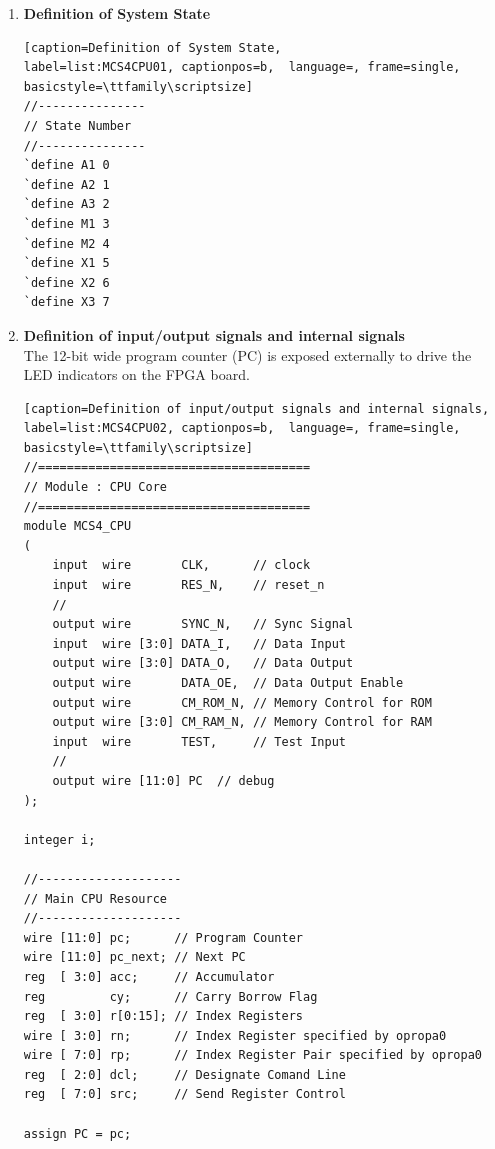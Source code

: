 \begin{enumerate}[(1)]
\item \textbf{Definition of System State}\\
\begin{lstlisting}[caption=Definition of System State, 
label=list:MCS4CPU01, captionpos=b,  language=, frame=single, basicstyle=\ttfamily\scriptsize]
//---------------
// State Number
//---------------
`define A1 0
`define A2 1
`define A3 2
`define M1 3
`define M2 4
`define X1 5
`define X2 6
`define X3 7
\end{lstlisting}

\item \textbf{Definition of input/output signals and internal signals}\\
The 12-bit wide program counter (PC) is exposed externally to drive the LED indicators on the FPGA board.\\
\begin{lstlisting}[caption=Definition of input/output signals and internal signals, 
label=list:MCS4CPU02, captionpos=b,  language=, frame=single, basicstyle=\ttfamily\scriptsize]
//======================================
// Module : CPU Core
//======================================
module MCS4_CPU
(
    input  wire       CLK,      // clock
    input  wire       RES_N,    // reset_n
    //
    output wire       SYNC_N,   // Sync Signal
    input  wire [3:0] DATA_I,   // Data Input
    output wire [3:0] DATA_O,   // Data Output
    output wire       DATA_OE,  // Data Output Enable
    output wire       CM_ROM_N, // Memory Control for ROM
    output wire [3:0] CM_RAM_N, // Memory Control for RAM
    input  wire       TEST,     // Test Input
    //
    output wire [11:0] PC  // debug
);

integer i;

//--------------------
// Main CPU Resource
//--------------------
wire [11:0] pc;      // Program Counter
wire [11:0] pc_next; // Next PC
reg  [ 3:0] acc;     // Accumulator
reg         cy;      // Carry Borrow Flag
reg  [ 3:0] r[0:15]; // Index Registers
wire [ 3:0] rn;      // Index Register specified by opropa0
wire [ 7:0] rp;      // Index Register Pair specified by opropa0
reg  [ 2:0] dcl;     // Designate Comand Line
reg  [ 7:0] src;     // Send Register Control

assign PC = pc;
\end{lstlisting}


\end{enumerate}
